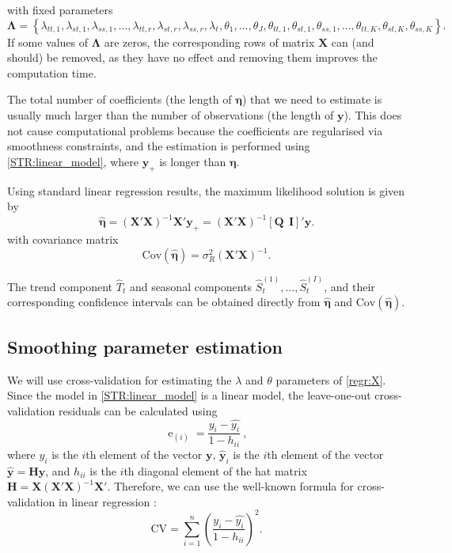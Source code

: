 \documentclass[11pt,a4paper,]{article}
\begin{document}
with fixed parameters
\[
  \bm{\Lambda} = \left\{\lambda_{tt,1}, \lambda_{st,1}, \lambda_{ss,1},
    \dots, \lambda_{tt,r}, \lambda_{st,r}, \lambda_{ss,r}, \lambda_\ell,
    \theta_1, \dots, \theta_J, \theta_{tt,1}, \theta_{st,1}, \theta_{ss,1},
    \dots, \theta_{tt,K}, \theta_{st,K}, \theta_{ss,K}
  \right\}.
\]
If some values of \(\bm{\Lambda}\) are zeros, the corresponding rows of matrix \(\bm{X}\) can (and should) be removed, as they have no effect and removing them improves the computation time.

The total number of coefficients (the length of \(\bm{\eta}\)) that we need to estimate is usually much larger than the number of observations (the length of \(\bm{y}\)). This does not cause computational problems because the coefficients are regularised via smoothness constraints, and the estimation is performed using \eqref{STR:linear_model}, where \(\bm{y}_{+}\) is longer than \(\bm{\eta}\).

Using standard linear regression results, the maximum likelihood solution is given by
\begin{equation}
  \label{STR:solution}
  \hat{\bm\eta} = (\bm{X}'\bm{X})^{-1}\bm{X}'\bm{y}_{+} = (\bm{X}'\bm{X})^{-1}[\bm{Q} ~~ \bm{I}]'\bm{y} .
\end{equation}
with covariance matrix
\begin{equation}
  \label{STR:beta_covar2}
  \text{Cov}(\hat{\bm\eta}) = \sigma_R^2 (\bm{X}'\bm{X})^{-1} .
\end{equation}

The trend component \(\hat{T}_t\) and seasonal components \(\hat{S}_t^{(1)},\dots,\hat{S}_t^{(I)}\), and their corresponding confidence intervals can be obtained directly from \(\hat{\bm\eta}\) and \(\text{Cov}(\hat{\bm\eta})\).

\hypertarget{sec:find_params}{%
\subsection{Smoothing parameter estimation}\label{sec:find_params}}

We will use cross-validation for estimating the \(\lambda\) and \(\theta\) parameters of \eqref{regr:X}. Since the model in \eqref{STR:linear_model} is a linear model, the leave-one-out cross-validation residuals can be calculated \autocite[see][]{seber2012linear} using
\begin{equation}
  \label{FindLambdas:residuals}
  \operatorname{e}_{(i)} = \frac{y_i-\hat{y_i}}{1-h_{ii}}\ ,
\end{equation}
where \(y_i\) is the \(i\)th element of the vector \(\bm{y}\), \(\hat{\bm y}_i\) is the \(i\)th element of the vector \(\hat{\bm y} = \bm{H}\bm{y}\), and \(h_{ii}\) is the \(i\)th diagonal element of the hat matrix \(\bm{H} = \bm{X}(\bm{X}'\bm{X})^{-1}\bm{X}'\).
Therefore, we can use the well-known formula for cross-validation in linear regression \autocite[see, for example,][p.45]{RWC02}:
\begin{equation}
  \label{FindLambdas:CV}
  \text{CV} = \sum_{i=1}^{n}\left(\frac{y_i-\hat{y_i}}{1-h_{ii}}\right)^2.
\end{equation}
\end{document}
